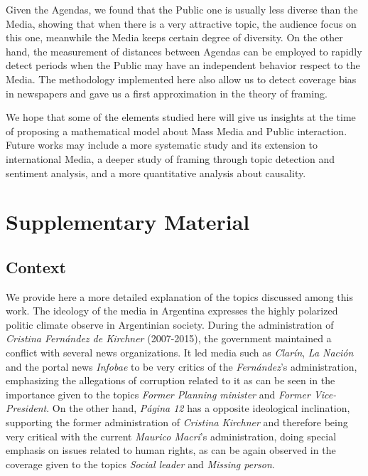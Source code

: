 \documentclass{bmcart}
\begin{document}
\par Given the Agendas, we found that the Public one is usually less diverse than the Media, showing that when there is a very attractive topic, the audience focus on this one, meanwhile the Media keeps certain degree of diversity. 
On the other hand, the measurement of distances between Agendas can be employed to rapidly detect periods when the Public may have an independent behavior respect to the Media. The methodology implemented here also allow us to detect coverage bias in newspapers and gave us a first approximation in the theory of framing. 
\par We hope that some of the elements studied here will give us insights at the time of proposing a mathematical model about Mass Media and Public interaction. Future works may include a more systematic study and its extension to international Media, a deeper study of framing through topic detection and sentiment analysis, and a more quantitative analysis about causality.

\newpage
\section*{Supplementary Material}
\subsection*{Context}
\label{sec:Context}

\par We provide here a more detailed explanation of the topics discussed among this work.
The ideology of the media in Argentina expresses the highly polarized politic climate observe in Argentinian society.
During the administration of \emph{Cristina Fern\'andez de Kirchner} (2007-2015), the government maintained a conflict with several news organizations.
It led media such as \emph{Clar\'in}, \emph{La Naci\'on} and the portal news \emph{Infobae} to be very critics of the \emph{Fern\'andez}'s administration, emphasizing the allegations of corruption related to it as can be seen in the importance given to the topics \emph{Former Planning minister} and \emph{Former Vice-President}.
On the other hand, \emph{P\'agina 12} has a opposite ideological inclination, supporting the former administration of \emph{Cristina Kirchner} and therefore being very critical with the current \emph{Maurico Macri}'s administration, doing special emphasis on issues related to human rights, as can be again observed in the coverage given to the topics \emph{Social leader} and \emph{Missing person}.
\end{document}
